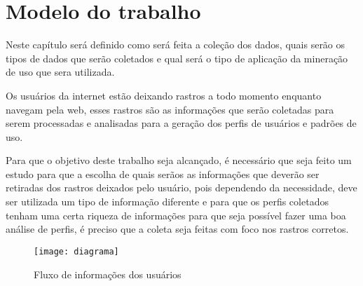 \chapter{Modelo do trabalho}

    Neste capítulo será definido como será feita a coleção dos dados, quais serão os tipos de dados que serão coletados e qual será o tipo de aplicação da mineração de uso que sera utilizada.

    Os usuários da internet estão deixando rastros a todo momento enquanto navegam pela web, esses rastros são as informações que serão coletadas para serem processadas e analisadas para a geração dos perfis de usuários e padrões de uso.

    Para que o objetivo deste trabalho seja alcançado, é necessário que seja feito um estudo para que a escolha de quais serãos as informações que deverão ser retiradas dos rastros deixados pelo usuário, pois dependendo da necessidade, deve ser utilizada um tipo de informação diferente e para que os perfis coletados tenham uma certa riqueza de informações para que seja possível fazer uma boa análise de perfis, é preciso que a coleta seja feitas com foco nos rastros corretos.

\begin{figure}[!htb]
\centering
\texttt{[image: diagrama]}
\caption{Fluxo de informações dos usuários}
\label{Rotulo}
\end{figure}

